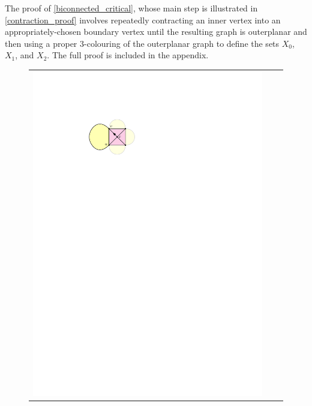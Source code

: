\documentclass[a4paper,UKenglish,cleveref, autoref, thm-restate]{lipics-v2021}
\begin{document}
The proof of \cref{biconnected_critical}, whose main step is illustrated in \cref{contraction_proof} involves repeatedly contracting an inner vertex into an appropriately-chosen boundary vertex until the resulting graph is outerplanar and then using a proper $3$-colouring of the outerplanar graph to define the sets $X_0$, $X_1$, and $X_2$.  The full proof is included in the appendix.

\begin{figure}
  \centering
  \begin{tabular}{ccc}
    \includegraphics[page=1]{figs/biconnected} &

\end{tabular}
\end{figure}
\end{document}
